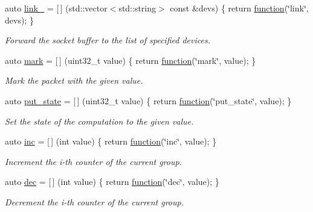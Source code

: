 \begin{DoxyCompactItemize}
auto \hyperlink{namespacepfq_1_1lang_1_1anonymous__namespace_02default_8hpp_03_aaad98f847b8e4c53a5ddec3c93b05296}{link\+\_\+} = \mbox{[}$\,$\mbox{]} (std\+::vector$<$std\+::string$>$ const \&devs) \{ return \hyperlink{namespacepfq_1_1lang_a1a4638059d700ae08d0ca63886ff2bb3}{function}(\char`\"{}link\char`\"{}, devs); \}
\begin{DoxyCompactList}\small\item\em Forward the socket buffer to the list of specified devices. \end{DoxyCompactList}\item 
auto \hyperlink{namespacepfq_1_1lang_1_1anonymous__namespace_02default_8hpp_03_a7b831baeabda070b89ca862a9445a4a8}{mark} = \mbox{[}$\,$\mbox{]} (uint32\+\_\+t value) \{ return \hyperlink{namespacepfq_1_1lang_a1a4638059d700ae08d0ca63886ff2bb3}{function}(\char`\"{}mark\char`\"{}, value); \}
\begin{DoxyCompactList}\small\item\em Mark the packet with the given value. \end{DoxyCompactList}\item 
auto \hyperlink{namespacepfq_1_1lang_1_1anonymous__namespace_02default_8hpp_03_afd94f51db878b2f70225c944c3f1d300}{put\+\_\+state} = \mbox{[}$\,$\mbox{]} (uint32\+\_\+t value) \{ return \hyperlink{namespacepfq_1_1lang_a1a4638059d700ae08d0ca63886ff2bb3}{function}(\char`\"{}put\+\_\+state\char`\"{}, value); \}
\begin{DoxyCompactList}\small\item\em Set the state of the computation to the given value. \end{DoxyCompactList}\item 
auto \hyperlink{namespacepfq_1_1lang_1_1anonymous__namespace_02default_8hpp_03_acc7d3a4cca5eb30ff5456e19c613b174}{inc} = \mbox{[}$\,$\mbox{]} (int value) \{ return \hyperlink{namespacepfq_1_1lang_a1a4638059d700ae08d0ca63886ff2bb3}{function}(\char`\"{}inc\char`\"{}, value); \}
\begin{DoxyCompactList}\small\item\em Increment the i-\/th counter of the current group. \end{DoxyCompactList}\item 
auto \hyperlink{namespacepfq_1_1lang_1_1anonymous__namespace_02default_8hpp_03_a139906841e77a2eb86b761b27ceeb685}{dec} = \mbox{[}$\,$\mbox{]} (int value) \{ return \hyperlink{namespacepfq_1_1lang_a1a4638059d700ae08d0ca63886ff2bb3}{function}(\char`\"{}dec\char`\"{}, value); \}
\begin{DoxyCompactList}\small\item\em Decrement the i-\/th counter of the current group. \end{DoxyCompactList}\item 

\end{DoxyCompactItemize}
